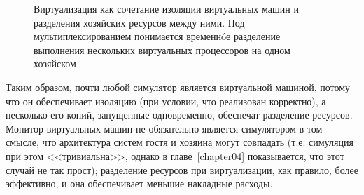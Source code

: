 \begin{figure}[htb]
    \centering
    \caption[Виртуализация как сочетание изоляции и разделения ресурсов]{Виртуализация как сочетание изоляции виртуальных машин и разделения хозяйских ресурсов между ними. Под мультиплексированием понимается временн\'{o}е разделение выполнения нескольких виртуальных процессоров на одном хозяйском}
    \label{fig:multiplexing}
\end{figure}

Таким образом, почти любой симулятор является виртуальной машиной, потому что он обеспечивает изоляцию (при условии, что реализован корректно), а несколько его копий, запущенные одновременно, обеспечат разделение ресурсов. Монитор виртуальных машин не обязательно является симулятором в том смысле, что архитектура систем гостя и хозяина могут совпадать (т.е. симуляция при этом <<тривиальна>>, однако в главе~\ref{chapter04} показывается, что этот случай не так прост); разделение ресурсов при виртуализации, как правило, более эффективно, и она обеспечивает меньшие накладные расходы.

